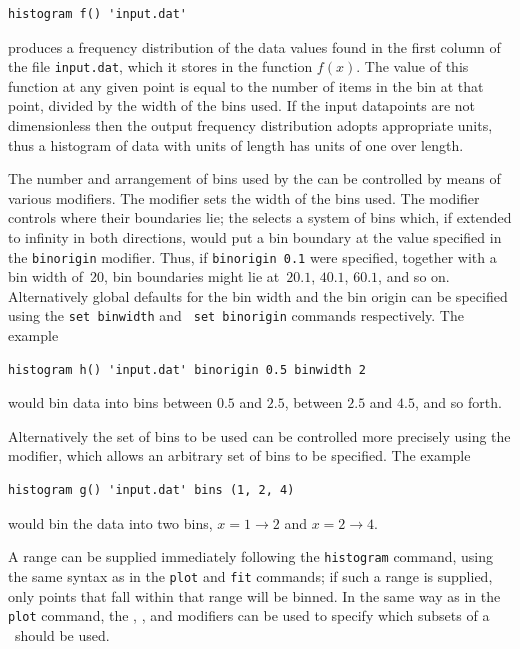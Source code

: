 \begin{verbatim}
histogram f() 'input.dat'
\end{verbatim}

\noindent produces a frequency distribution of the data values found in the
first column of the file {\tt input.dat}, which it stores in the function
$f(x)$. The value of this function at any given point is equal to the number of
items in the bin at that point, divided by the width of the bins used. If the
input datapoints are not dimensionless then the output frequency distribution
adopts appropriate units, thus a histogram of data with units of length has
units of one over length.

The number and arrangement of bins used by the  can be
controlled by means of various modifiers.  The  modifier sets
the width of the bins used. The  modifier controls where
their boundaries lie; the  selects a system of bins which,
if extended to infinity in both directions, would put a bin boundary at the
value specified in the {\tt binorigin} modifier. Thus, if {\tt binorigin 0.1}
were specified, together with a bin width of~20, bin boundaries might lie
at~$20.1$, $40.1$, $60.1$, and so on. Alternatively global defaults for the bin
width and the bin origin can be specified using the {\tt set binwidth} and {\tt
set binorigin} commands respectively. The example

\begin{verbatim}
histogram h() 'input.dat' binorigin 0.5 binwidth 2
\end{verbatim}

\noindent would bin data into bins between $0.5$ and $2.5$, between $2.5$ and
$4.5$, and so forth.

Alternatively the set of bins to be used can be controlled more precisely using
the  modifier, which allows an arbitrary set of bins to be
specified. The example

\begin{verbatim}
histogram g() 'input.dat' bins (1, 2, 4)
\end{verbatim}

\noindent would bin the data into two bins, $x=1\to 2$ and $x=2\to 4$.

A range can be supplied immediately following the {\tt histogram} command,
using the same syntax as in the {\tt plot} and {\tt fit} commands; if such a
range is supplied, only points that fall within that range will be binned.  In
the same way as in the {\tt plot} command, the ,
,  and  modifiers can be used to
specify which subsets of a \datafile\ should be used.

